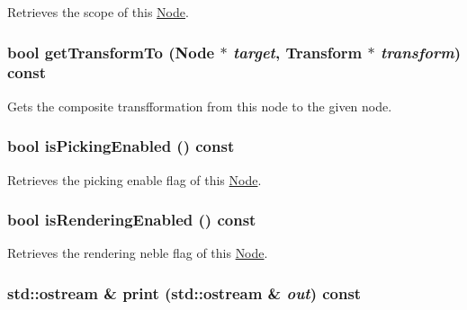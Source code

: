 Retrieves the scope of this \hyperlink{classm3g_1_1Node}{Node}. \hypertarget{classm3g_1_1Node_206a2e95eb7db42e6880414f77858113}{
\subsubsection[{getTransformTo}]{\setlength{\rightskip}{0pt plus 5cm}bool getTransformTo ({\bf Node} $\ast$ {\em target}, \/  {\bf Transform} $\ast$ {\em transform}) const}}
\label{classm3g_1_1Node_206a2e95eb7db42e6880414f77858113}


Gets the composite transfformation from this node to the given node. \hypertarget{classm3g_1_1Node_b3187e5056afa4a94af03e34125c86b1}{
\subsubsection[{isPickingEnabled}]{\setlength{\rightskip}{0pt plus 5cm}bool isPickingEnabled () const}}
\label{classm3g_1_1Node_b3187e5056afa4a94af03e34125c86b1}


Retrieves the picking enable flag of this \hyperlink{classm3g_1_1Node}{Node}. \hypertarget{classm3g_1_1Node_95020b155afed9552cc55377b09b1e86}{
\subsubsection[{isRenderingEnabled}]{\setlength{\rightskip}{0pt plus 5cm}bool isRenderingEnabled () const}}
\label{classm3g_1_1Node_95020b155afed9552cc55377b09b1e86}


Retrieves the rendering neble flag of this \hyperlink{classm3g_1_1Node}{Node}. \hypertarget{classm3g_1_1Node_6fea17fa1532df3794f8cb39cb4f911f}{
\subsubsection[{print}]{\setlength{\rightskip}{0pt plus 5cm}std::ostream \& print (std::ostream \& {\em out}) const}}
\label{classm3g_1_1Node_6fea17fa1532df3794f8cb39cb4f911f}


